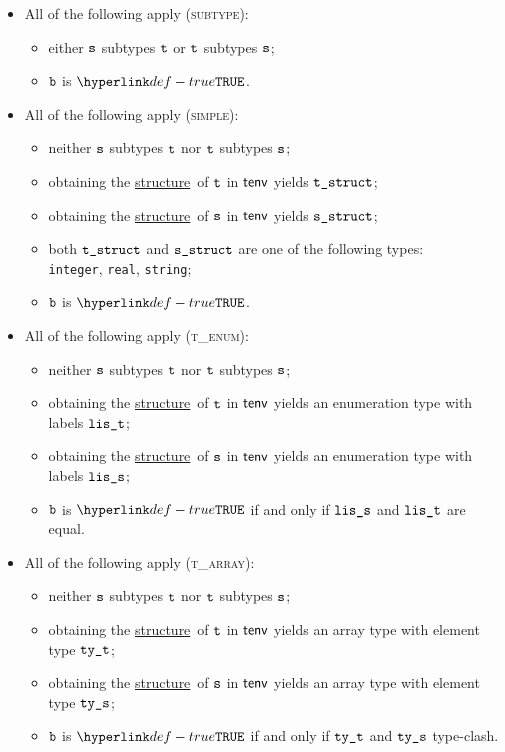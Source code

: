 \documentclass{book}
\newcommand\ProseOrTypeError[0]{\ProseTerminateAs{\TypeErrorConfig}}
\newcommand\structure[0]{\hyperlink{def-structure}{structure}}
\begin{document}
\begin{itemize}
  \item All of the following apply (\textsc{subtype}):
  \begin{itemize}
    \item either $\texttt{s}$ subtypes $\texttt{t}$ or $\texttt{t}$ subtypes $\texttt{s}$;
    \item $\texttt{b}$ is $\True$.
  \end{itemize}

  \item All of the following apply (\textsc{simple}):
  \begin{itemize}
    \item neither $\texttt{s}$ subtypes $\texttt{t}$ nor $\texttt{t}$ subtypes $\texttt{s}$;
    \item obtaining the \structure\ of $\texttt{t}$ in $\textsf{tenv}$ yields $\texttt{t\_struct}$\ProseOrTypeError;
    \item obtaining the \structure\ of $\texttt{s}$ in $\textsf{tenv}$ yields $\texttt{s\_struct}$\ProseOrTypeError;
    \item both $\texttt{t\_struct}$ and $\texttt{s\_struct}$ are one of the following types: \\ \texttt{integer}, \texttt{real}, \texttt{string};
    \item $\texttt{b}$ is $\True$.
  \end{itemize}

  \item All of the following apply (\textsc{t\_enum}):
  \begin{itemize}
    \item neither $\texttt{s}$ subtypes $\texttt{t}$ nor $\texttt{t}$ subtypes $\texttt{s}$;
    \item obtaining the \structure\ of $\texttt{t}$ in $\textsf{tenv}$ yields an enumeration type with labels $\texttt{lis\_t}$;
    \item obtaining the \structure\ of $\texttt{s}$ in $\textsf{tenv}$ yields an enumeration type with labels $\texttt{lis\_s}$;
    \item $\texttt{b}$ is $\True$ if and only if $\texttt{lis\_s}$ and $\texttt{lis\_t}$ are equal.
  \end{itemize}

  \item All of the following apply (\textsc{t\_array}):
  \begin{itemize}
    \item neither $\texttt{s}$ subtypes $\texttt{t}$ nor $\texttt{t}$ subtypes $\texttt{s}$;
    \item obtaining the \structure\ of $\texttt{t}$ in $\textsf{tenv}$ yields an array type with element type $\texttt{ty\_t}$;
    \item obtaining the \structure\ of $\texttt{s}$ in $\textsf{tenv}$ yields an array type with element type $\texttt{ty\_s}$;
    \item $\texttt{b}$ is $\True$ if and only if $\texttt{ty\_t}$ and $\texttt{ty\_s}$ type-clash.
  \end{itemize}


\end{itemize}
\end{document}
